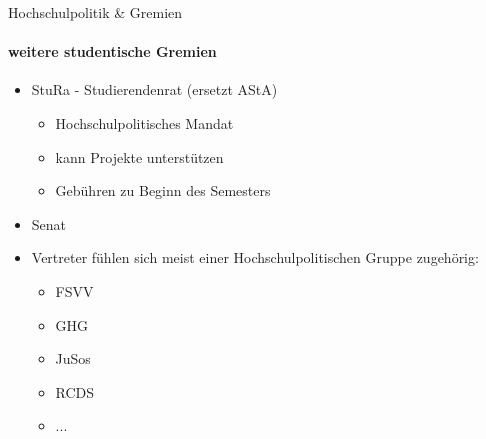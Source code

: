 \documentclass{beamer}
\begin{document}
	\begin{frame}{Hochschulpolitik \& Gremien}
		\framesubtitle{weitere studentische Gremien}
	 	\begin{itemize}
	 		\item StuRa - Studierendenrat (ersetzt AStA)
	 			\begin{itemize}
	 				\item Hochschulpolitisches Mandat
	 				\item kann Projekte unterstützen
	 				\item Gebühren zu Beginn des Semesters
	 			\end{itemize}
	 		\item Senat
	 		\item Vertreter fühlen sich meist einer Hochschulpolitischen Gruppe zugehörig:
	 			\begin{itemize}
	 				\item FSVV
	 				\item GHG
	 				\item JuSos
	 				\item RCDS
	 				\item ...
	 			\end{itemize}
	 	\end{itemize}
	 \end{frame}
	
\end{document}
